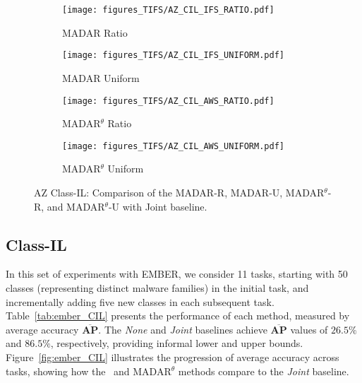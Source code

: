 \begin{figure}[!t]
    \centering
    \begin{subfigure}{0.485\linewidth}
        \centering
        \texttt{[image: figures\_TIFS/AZ\_CIL\_IFS\_RATIO.pdf]}
        \label{fig:AZ_CIL_IFS_R}
        \vspace{-0.4cm}
        \caption{MADAR Ratio}
    \end{subfigure}
    \hfill
    \begin{subfigure}{0.485\linewidth}
        \centering
        \texttt{[image: figures\_TIFS/AZ\_CIL\_IFS\_UNIFORM.pdf]}
        \label{fig:AZ_CIL_IFS_U}
        \vspace{-0.4cm}
        \caption{MADAR Uniform}
    \end{subfigure}
    \vfill
    \begin{subfigure}{0.485\linewidth}
        \centering
        \texttt{[image: figures\_TIFS/AZ\_CIL\_AWS\_RATIO.pdf]}
        \label{fig:AZ_CIL_AWS_R}
        \vspace{-0.4cm}
        \caption{MADAR$^\theta$ Ratio}
    \end{subfigure}
    \hfill
    \begin{subfigure}{0.485\linewidth}
        \centering
        \texttt{[image: figures\_TIFS/AZ\_CIL\_AWS\_UNIFORM.pdf]}
        \label{fig:AZ_CIL_AWS_U}
        \vspace{-0.4cm}
        \caption{MADAR$^\theta$ Uniform}
    \end{subfigure}

    \caption{AZ Class-IL: Comparison of the MADAR-R, MADAR-U, MADAR$^\theta$-R, and MADAR$^\theta$-U with Joint baseline.}
    \label{fig:az_CIL}
    \vspace{-0.3cm}
\end{figure}





\subsection{Class-IL}
\label{classilexps}



In this set of experiments with EMBER, we consider 11 tasks, starting with 50 classes (representing distinct malware families) in the initial task, and incrementally adding five new classes in each subsequent task. Table~\ref{tab:ember_CIL} presents the performance of each method, measured by average accuracy $\mathbf{\overline{AP}}$. The \textit{None} and \textit{Joint} baselines achieve $\mathbf{\overline{AP}}$ values of $26.5\%$ and $86.5\%$, respectively, providing informal lower and upper bounds. Figure~\ref{fig:ember_CIL} illustrates the progression of average accuracy across tasks, showing how the \system\ and MADAR$^\theta$ methods compare to the \textit{Joint} baseline.

